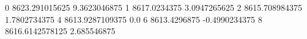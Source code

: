 0 8623.291015625 9.3623046875
1 8617.0234375 3.0947265625
2 8615.708984375 1.7802734375
4 8613.9287109375 0.0
6 8613.4296875 -0.4990234375
8 8616.6142578125 2.685546875
